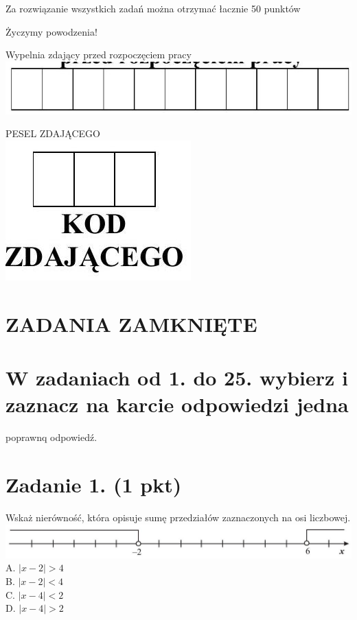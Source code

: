 \documentclass[10pt]{article}
\begin{document}
Za rozwiązanie wszystkich zadań można otrzymać łacznie 50 punktów

Życzymy powodzenia!

Wypelnia zdający przed rozpoczęciem pracy\\
\includegraphics[max width=\textwidth, center]{2024_11_21_ad52a81220b9b2239458g-01}

PESEL ZDAJĄCEGO\\
\includegraphics[max width=\textwidth, center]{2024_11_21_ad52a81220b9b2239458g-01(1)}

\section*{ZADANIA ZAMKNIĘTE}
\section*{W zadaniach od 1. do 25. wybierz i zaznacz na karcie odpowiedzi jedna}
poprawnq odpowiedź.

\section*{Zadanie 1. (1 pkt)}
Wskaż nierówność, która opisuje sumę przedziałów zaznaczonych na osi liczbowej.\\
\includegraphics[max width=\textwidth, center]{2024_11_21_ad52a81220b9b2239458g-02}\\
A. \(|x-2|>4\)\\
B. \(|x-2|<4\)\\
C. \(|x-4|<2\)\\
D. \(|x-4|>2\)
\end{document}
